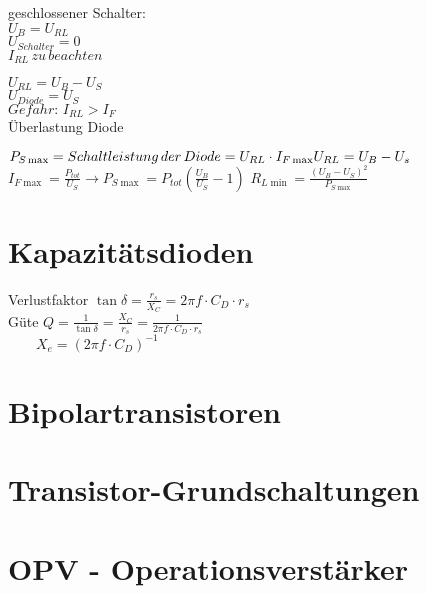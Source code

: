     \begin{minipage}{0.2\columnwidth}
        geschlossener Schalter:\\
        $U_B=U_{RL}$\\
        $U_{Schalter}=0$\\
        $I_{RL}\, zu\, beachten$
    \end{minipage}
    \begin{minipage}{0.5\columnwidth}
    \end{minipage}
    \begin{minipage}{0.3\columnwidth}
        $U_{RL}=U_B-U_S$\\
        $U_{Diode}=U_S$\\
        $Gefahr:\, I_{RL}>I_F$\\
        Überlastung Diode
    \end{minipage}

    $P_{S\max}=Schaltleistung\, der\, Diode=U_{RL}\cdot I_{F\max}\\
    U_{RL}=U_B-U_s$\hspace*{1cm}$I_{F\max}=\frac{P_{tot}}{U_S}\longrightarrow P_{S\max}=P_{tot}(\frac{U_B}{U_S}-1)$
    \hspace*{1cm}$R_{L\min}=\frac{(U_B-U_S)^2}{P_{S\max}}$

\section{Kapazitätsdioden}
    \begin{minipage}{0.3\columnwidth}
    \end{minipage}
    \begin{minipage}{0.6\columnwidth}
        Verlustfaktor $\tan\delta=\frac{r_s}{X_C}=2\pi f\cdot C_D\cdot r_s$\\
        Güte $Q=\frac{1}{\tan\delta}=\frac{X_C}{r_s}=\frac{1}{2\pi f\cdot C_D\cdot r_s}$\\
        $\quad\quad X_e=(2\pi f\cdot C_D)^{-1}$\\
    \end{minipage}

\section{Bipolartransistoren}
    
\section{Transistor-Grundschaltungen}
    
\section{OPV - Operationsverstärker}
    
